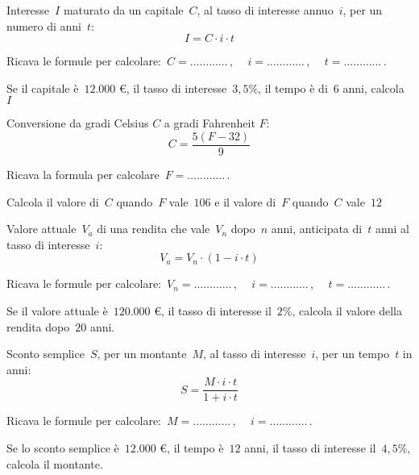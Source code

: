 \subsubsection*{}

\begin{esercizio}
\label{ese:20.53}
Interesse~$I$ maturato da un capitale~$C$, al tasso di interesse annuo~$i$, 
per un numero di anni~$t$:
\begin{equation*}
  I=C\cdot i\cdot t
\end{equation*}

Ricava le formule per calcolare:~$C=\ldots\ldots\ldots\ldots$\,, $\quad 
i=\ldots\ldots\ldots\ldots$\,, $\quad t =\ldots\ldots\ldots\ldots$\,.

Se il capitale è~$12.000$ €, il tasso di interesse~$3,5\%$, il tempo è di~$6$ 
anni, calcola~$I$
\end{esercizio}

\begin{esercizio}
\label{ese:20.54}
Conversione da gradi Celsius $C$ a gradi Fahrenheit $F$:
\begin{equation*}
  C=\frac{5(F-32)}{9}
\end{equation*}

Ricava la formula per calcolare\, $F=\ldots\ldots\ldots\ldots$\,.

Calcola il valore di~$C$ quando~$F$ vale~$106$ e il valore di~$F$ 
quando~$C$ vale~$12$
\end{esercizio}

\begin{esercizio}
\label{ese:20.55}
Valore attuale~$V_a$ di una rendita che vale~$V_n$ dopo~$n$ anni, 
anticipata di~$t$ anni al tasso di interesse~$i$:
\begin{equation*}
  V_{a}=V_{n}\cdot (1-i\cdot t)
\end{equation*}

Ricava le formule per calcolare:~$V_n=\ldots\ldots\ldots\ldots$\,, $\quad 
i=\ldots\ldots\ldots\ldots$\,, $\quad t =\ldots\ldots\ldots\ldots$\,.

Se il valore attuale è~$120.000$ €, il tasso di interesse il~$2\%$, 
calcola il valore della rendita dopo~$20$ anni.
\end{esercizio}

\begin{esercizio}
\label{ese:20.56}
Sconto semplice~$S$, per un montante~$M$, al tasso di interesse~$i$, per un 
tempo~$t$ in anni:
\begin{equation*}
  S=\frac{M\cdot i\cdot t}{1+i\cdot t}
\end{equation*}

Ricava le formule per calcolare:~$M=\ldots\ldots\ldots\ldots$\,, $\quad 
i=\ldots\ldots\ldots\ldots$\,.

Se lo sconto semplice è~$12.000$ €, il tempo è~$12$ anni, il tasso di 
interesse il~$4,5\%$, calcola il montante.
\end{esercizio}

